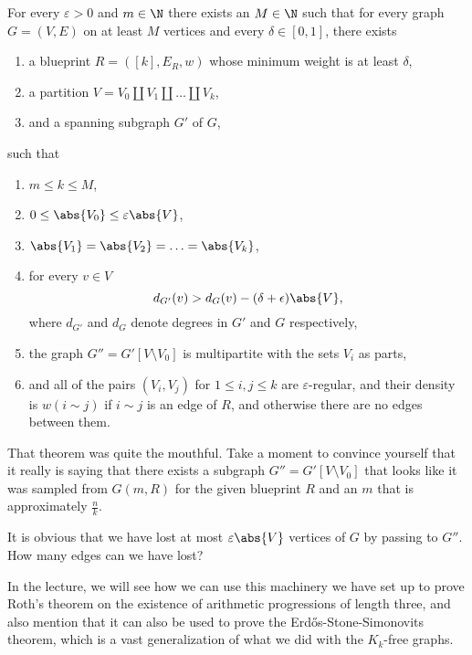\documentclass[nobib]{tufte-handout}
\begin{document}
\begin{theorem}
  For every $\varepsilon > 0$ and $m \in \N$ there exists an $M \in \N$ such that for every graph $G = (V,E)$ on at least $M$ vertices and every $\delta \in [0,1]$, there exists
  \begin{enumerate}[label=\alph*)]
    \item a blueprint $R = ([k],E_R,w)$ whose minimum weight is at least $\delta$,
    \item a partition $V = V_0 \coprod V_1 \coprod \ldots \coprod V_k$,
    \item and a spanning subgraph $G'$ of $G$,
  \end{enumerate}
  such that
  \begin{enumerate}
    \item $m \leq k \leq M$,
    \item $0 \leq \abs{V_0} \leq \varepsilon\abs{V}$,
    \item $\abs{V_1} = \abs{V_2} = \ldots = \abs{V_k}$,
    \item for every $v \in V$
    $$d_{G'}(v) > d_G(v) - (\delta + \epsilon)\abs{V},$$
    where $d_{G'}$ and $d_G$ denote degrees in $G'$ and $G$ respectively,
    \item the graph $G'' = G'[V\setminus V_0]$ is multipartite with the sets $V_i$ as parts,
    \item and all of the pairs $(V_i, V_j)$ for $1 \leq i, j \leq k$ are $\varepsilon$-regular, and their density is $w(i \sim j)$ if $i \sim j$ is an edge of $R$, and otherwise there are no edges between them. 
  \end{enumerate}
\end{theorem}

\begin{xca}
  That theorem was quite the mouthful. Take a moment to convince yourself that it really is saying that there exists a subgraph $G'' = G'[V \setminus V_0]$ that looks like it was sampled from $G(m, R)$ for the given blueprint $R$ and an $m$ that is approximately $\frac{n}{k}$.

  It is obvious that we have lost at most $\varepsilon\abs{V}$ vertices of $G$ by passing to $G''$. How many edges can we have lost?
\end{xca}

In the lecture, we will see how we can use this machinery we have set up to prove Roth's theorem on the existence of arithmetic progressions of length three, and also mention that it can also be used to prove the Erd\H{o}s-Stone-Simonovits theorem, which is a vast generalization of what we did with the $K_k$-free graphs.

%
%
\end{document}
